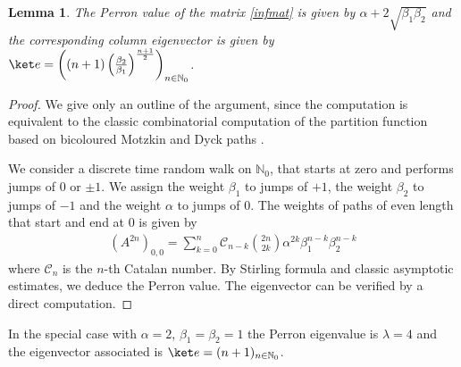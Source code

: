 \documentclass[reqno]{amsart}
\theoremstyle{plain}
\newtheorem{lemma}[theorem]{Lemma}
\theoremstyle{definition}
\theoremstyle{remark}
\numberwithin{equation}{section}
\numberwithin{theorem}{section}
\newcommand{\<}{\langle}
\renewcommand{\>}{\rangle}
\begin{document}
	\begin{lemma}\label{perronlemma}
		The Perron value of the matrix \eqref{infmat} is given by $\alpha+2\sqrt{\beta_1\beta_2}$ and the corresponding column eigenvector is given by 
		$\ket e= \left((n+1) \left(\frac{\beta_2}{\beta_1} \right)^{\frac{n+1}{2}}\right)_{n\in \mathbb N_0}$.
	\end{lemma}
	\begin{proof}
		We give only an outline of the argument, since the computation is equivalent to the classic combinatorial computation of the partition function based on bicoloured Motzkin and Dyck paths \cite{review}.
		
		We consider a discrete time random walk on $\mathbb N_0$, that starts at zero and performs jumps of $0$ or $\pm 1$. We assign the weight $\beta_1$ to jumps of $+1$, the weight $\beta_2$ to jumps of $-1$ and the weight $\alpha$ to jumps of $0$. The weights of paths of even length that start and end at $0$ is given by
		\begin{align*}
			(A^{2n})_{0,0}= \sum_{k=0}^{n} \mathcal{C}_{n-k} \binom{2n}{2k} \alpha^{2k} \beta_1^{n-k} \beta_2^{n-k}
		\end{align*}
		where $\mathcal{C}_n$ is the $n$-th Catalan number. By Stirling formula and classic asymptotic estimates, we deduce the Perron value. The eigenvector can be verified by a direct computation.
	\end{proof}
	In the special case with $\alpha=2$, $\beta_1=\beta_2=1$ the Perron eigenvalue is $\lambda=4$ and the eigenvector associated is $\ket e=(n+1)_{n\in \mathbb N_0}$.
	
	
	
	
	

	
	
\end{document}
